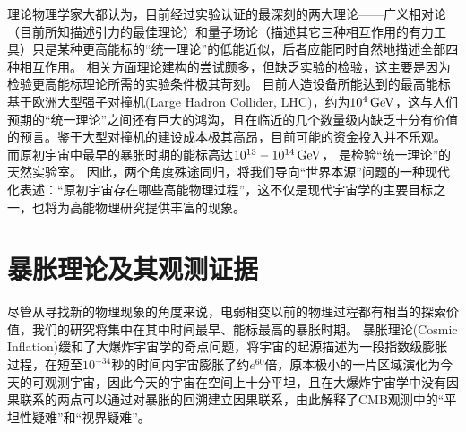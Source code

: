 理论物理学家大都认为，目前经过实验认证的最深刻的两大理论——广义相对论（目前所知描述引力的最佳理论）和量子场论（描述其它三种相互作用的有力工具）只是某种更高能标的“统一理论”的低能近似，后者应能同时自然地描述全部四种相互作用。
相关方面理论建构的尝试颇多，但缺乏实验的检验，这主要是因为检验更高能标理论所需的实验条件极其苛刻。
目前人造设备所能达到的最高能标基于欧洲大型强子对撞机(Large Hadron Collider, LHC)，约为$10^4\,{\rm GeV}$，这与人们预期的“统一理论”之间还有巨大的鸿沟，且在临近的几个数量级内缺乏十分有价值的预言。鉴于大型对撞机的建设成本极其高昂，目前可能的资金投入并不乐观。
而原初宇宙中最早的暴胀时期的能标高达$10^{13}-10^{14}\,{\rm GeV}$，%
是检验“统一理论”的天然实验室。
因此，两个角度殊途同归，将我们导向“世界本源”问题的一种现代化表述：“原初宇宙存在哪些高能物理过程”，这不仅是现代宇宙学的主要目标之一，也将为高能物理研究提供丰富的现象。

\section{暴胀理论及其观测证据}
尽管从寻找新的物理现象的角度来说，电弱相变以前的物理过程都有相当的探索价值，我们的研究将集中在其中时间最早、能标最高的暴胀时期。
暴胀理论(Cosmic Inflation)\cite{guth1981inflation}缓和了大爆炸宇宙学的奇点问题，将宇宙的起源描述为一段指数级膨胀过程，在短至$10^{-34}$秒的时间内宇宙膨胀了约$e^{60}$倍，原本极小的一片区域演化为今天的可观测宇宙，因此今天的宇宙在空间上十分平坦，且在大爆炸宇宙学中没有因果联系的两点可以通过对暴胀的回溯建立因果联系，由此解释了CMB观测中的“平坦性疑难”和“视界疑难”。

